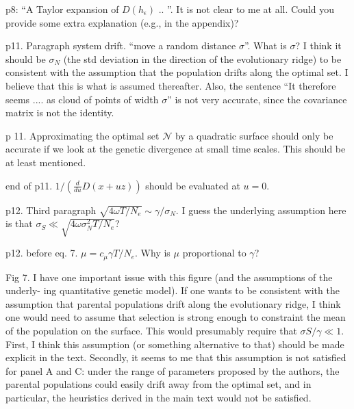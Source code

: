 \begin{point}{p8:}
    ``A Taylor expansion of $D(h_\epsilon)$ .. ''. It is not clear to me at all. Could you provide some
extra explanation (e.g., in the appendix)?
\end{point}

\reply{
}

\begin{point}{p11. Paragraph system drift.}
    ``move a random distance $\sigma$''. What is $\sigma$? I think it should
be $\sigma_N$ (the std deviation in the direction of the evolutionary ridge) to be consistent with
the assumption that the population drifts along the optimal set. I believe that this is what
is assumed thereafter. Also, the sentence ``It therefore seems .... as cloud of points of width
$\sigma$'' is not very accurate, since the covariance matrix is not the identity.
\end{point}

\reply{
}

\begin{point}{p 11.}
    Approximating the optimal set $\mathcal{N}$ by a quadratic surface should only be accurate if
we look at the genetic divergence at small time scales. This should be at least mentioned.
\end{point}

\reply{
}

\begin{point}{end of p11.}
    $1/( \frac{d}{du} D(x + uz))$ should be evaluated at $u = 0$.
\end{point}

\reply{
}

\begin{point}{p12. Third paragraph}
    $\sqrt{4 \omega T/N_e} \sim \gamma/\sigma_N$.
    I guess the underlying assumption here is that
    $\sigma_S \ll \sqrt{4 \omega \sigma^2_N T/N_e}$?
\end{point}

\reply{
}

\begin{point}{p12. before eq. 7.}
    $\mu = c_\mu \gamma T /N_e$. Why is $\mu$ proportional to $\gamma$?
\end{point}

\reply{
}

\begin{point}{Fig 7.}
    I have one important issue with this figure (and the assumptions of the underly-
ing quantitative genetic model). If one wants to be consistent with the assumption that
parental populations drift along the evolutionary ridge, I think one would need to assume
that selection is strong enough to constraint the mean of the population on the surface. This
would presumably require that $\sigma S /\gamma \ll 1$. First, I think this assumption (or something
alternative to that) should be made explicit in the text. Secondly, it seems to me that this
assumption is not satisfied for panel A and C: under the range of parameters proposed by
the authors, the parental populations could easily drift away from the optimal set, and in
particular, the heuristics derived in the main text would not be satisfied.
\end{point}

